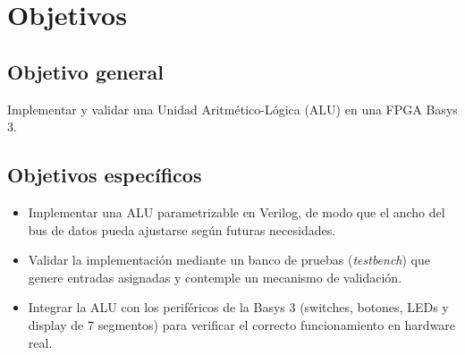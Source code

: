 \section{Objetivos}

\subsection{Objetivo general}
Implementar y validar una Unidad Aritmético-Lógica (ALU) en una FPGA Basys 3.

\subsection{Objetivos específicos}
\begin{itemize}
    \item Implementar una ALU parametrizable en Verilog, de modo que el ancho del bus de datos pueda ajustarse según futuras necesidades.
    \item Validar la implementación mediante un banco de pruebas (\textit{testbench}) que genere entradas asignadas y contemple un mecanismo de validación.
    \item Integrar la ALU con los periféricos de la Basys 3 (switches, botones, LEDs y display de 7 segmentos) para verificar el correcto funcionamiento en hardware real.
\end{itemize}
